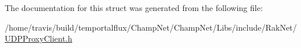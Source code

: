 The documentation for this struct was generated from the following file\-:\begin{DoxyCompactItemize}
\item 
/home/travis/build/temportalflux/\-Champ\-Net/\-Champ\-Net/\-Libs/include/\-Rak\-Net/\hyperlink{_u_d_p_proxy_client_8h}{U\-D\-P\-Proxy\-Client.\-h}\end{DoxyCompactItemize}
